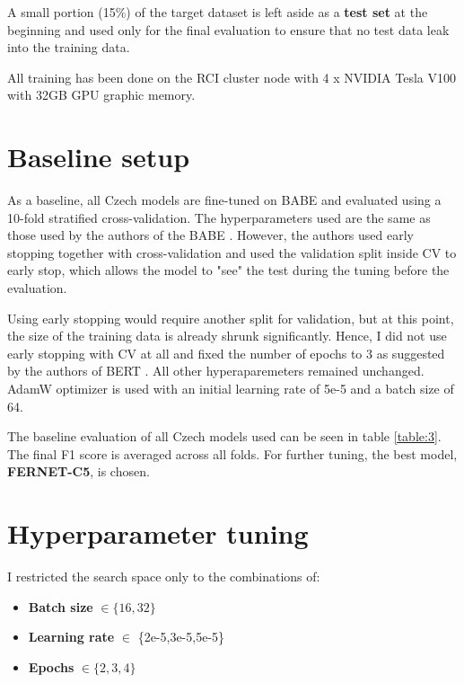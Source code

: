 A small portion (15\%) of the target dataset is left aside as a \textbf{test set} at the beginning and used only for the final evaluation to ensure that no test data leak into the training data.

All training has been done on the RCI cluster node with 4 x NVIDIA Tesla V100 with 32GB GPU graphic memory.





 \section{Baseline setup}
 As a baseline, all Czech models are fine-tuned on BABE and evaluated using a 10-fold stratified cross-validation. The hyperparameters used are the same as those used by the authors of the BABE \cite{Spinde2021MBIC}. However, the authors used early stopping together with cross-validation and used the validation split inside CV to early stop, which allows the model to "see" the test during the tuning before the evaluation. 
 
 Using early stopping would require another split for validation, but at this point, the size of the training data is already shrunk significantly. Hence, I did not use early stopping with CV at all and fixed the number of epochs to 3 as suggested by the authors of BERT \cite{devlin2019bert} . 
 All other hyperaparemeters remained unchanged. AdamW optimizer is used with an initial learning rate of 5e-5 and a batch size of 64.
 
 The baseline evaluation of all Czech models used can be seen in table \ref{table:3}. The final F1 score is averaged across all folds. For further tuning, the best model, \textbf{FERNET-C5}, is chosen.
 

 
 

 
 
 
 
\newpage

 \section{Hyperparameter tuning}
I restricted the search space only to the combinations of:
 \begin{itemize}
     \item \textbf{Batch size} $\in \{16,32\}$
     \item \textbf{Learning rate} $\in $ \{2e-5,3e-5,5e-5\}
     \item \textbf{Epochs} $\in \{2,3,4\}$
 \end{itemize}
 
